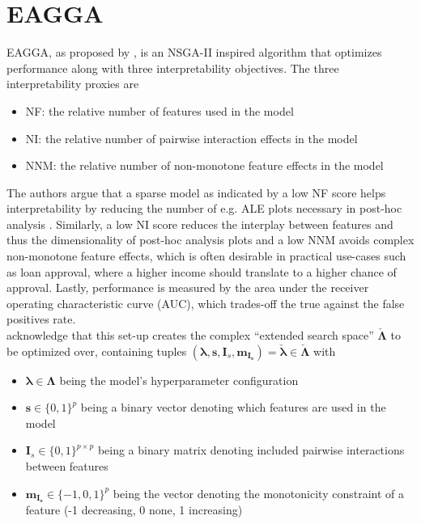 \documentclass[twoside,11pt]{article}
\begin{document}
\section{EAGGA}
EAGGA, as proposed by \citet{EAGGA}, is an NSGA-II inspired algorithm that optimizes performance along with three interpretability objectives.
The three interpretability proxies are
\begin{itemize}
  \item NF: the relative number of features used in the model
  \item NI: the relative number of pairwise interaction effects in the model
  \item NNM: the relative number of non-monotone feature effects in the model
\end{itemize}
The authors argue that a sparse model as indicated by a low NF score helps interpretability by reducing the number of e.g. ALE plots necessary in post-hoc
analysis \citep[p. 540]{EAGGA}. Similarly, a low NI score reduces the interplay between features and thus the dimensionality of post-hoc analysis plots
and a low NNM avoids complex non-monotone feature effects, which is often desirable in practical use-cases such as loan approval, where a higher income should
translate to a higher chance of approval.
Lastly, performance is measured by the area under the receiver operating characteristic curve (AUC), which trades-off the true against the false positives rate.
\\
\citet[pp. 540f]{EAGGA} acknowledge that this set-up creates the complex ``extended search space'' $\check{\boldsymbol\Lambda}$ to be optimized over, containing
tuples $(\boldsymbol\lambda, \boldsymbol{s}, \boldsymbol{I}_s, \boldsymbol{m}_{\boldsymbol{I}_{\boldsymbol{s}}})=\check{\boldsymbol\lambda}\in\check{\boldsymbol\Lambda}$
with
\begin{itemize}
  \item $\boldsymbol\lambda\in\boldsymbol\Lambda$ being the model's hyperparameter configuration
  \item $\boldsymbol{s}\in\{0,1\}^p$ being a binary vector denoting which features are used in the model
  \item $\boldsymbol{I}_s\in\{0,1\}^{p\times p}$ being a binary matrix denoting included pairwise interactions between features
  \item $\boldsymbol{m}_{\boldsymbol{I}_{\boldsymbol{s}}}\in\{-1,0,1\}^p$ being the vector denoting the monotonicity constraint of a feature (-1 decreasing, 0 none, 1 increasing)
\end{itemize}
\end{document}
